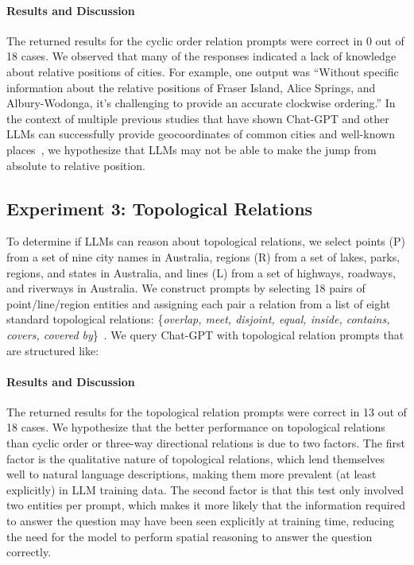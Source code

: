 \paragraph{Results and Discussion}
The returned results for the cyclic order relation prompts were correct in 0 out of 18 cases.
We observed that many of the responses indicated a lack of knowledge about relative positions of cities.
For example, one output was 
``Without specific information about the relative positions of Fraser Island, Alice Springs, and Albury-Wodonga, it's challenging to provide an accurate clockwise ordering.''
In the context of multiple previous studies that have shown Chat-GPT and other LLMs can successfully provide geocoordinates of common cities and well-known places~\cite{Bhandari2023,Qi2023}, we hypothesize that LLMs may not be able to make the jump from absolute to relative position. 



\subsection{Experiment 3: Topological Relations}
To determine if LLMs can reason about topological relations, we select points (P) from a set of nine city names in Australia, regions (R) from a set of lakes, parks, regions, and states in Australia, and lines (L) from a set of highways, roadways, and riverways in Australia.
We construct prompts by selecting 18 pairs of point/line/region entities and assigning each pair a relation from a list of eight standard topological relations: \{\textit{overlap, meet, disjoint, equal, inside, contains, covers, covered by}\}~\cite{Carniel2023}.
We query Chat-GPT with topological relation prompts that are structured like:
\begin{center}
\end{center}

\paragraph{Results and Discussion}
The returned results for the topological relation prompts were correct in 13 out of 18 cases.
We hypothesize that the better performance on topological relations than cyclic order or three-way directional relations is due to two factors.
The first factor is the qualitative nature of topological relations, which lend themselves well to natural language descriptions, making them more prevalent (at least explicitly) in LLM training data.
The second factor is that this test only involved two entities per prompt, which makes it more likely that the information required to answer the question may have been seen explicitly at training time, reducing the need for the model to perform spatial reasoning to answer the question correctly.

